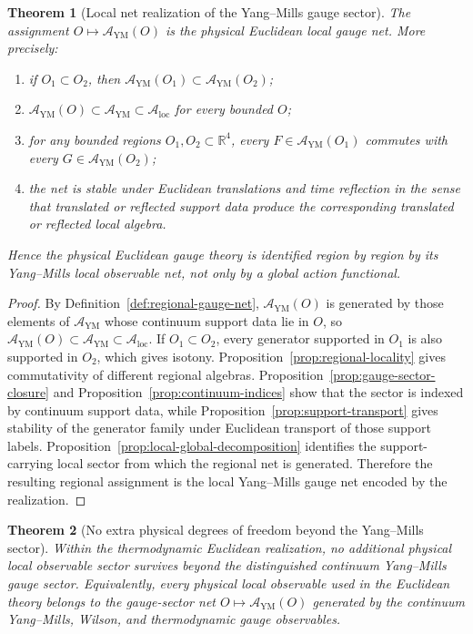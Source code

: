 \documentclass[11pt]{article}
\newtheorem{theorem}{Theorem}[section]
\theoremstyle{definition}
\theoremstyle{remark}
\newcommand{\R}{\mathbb R}
\newcommand{\mcA}{\mathcal A}
\begin{document}
\begin{theorem}[Local net realization of the Yang--Mills gauge sector]
\label{thm:local-net-equivalence}
The assignment \(O\mapsto \mcA_{\mathrm{YM}}(O)\) is the physical Euclidean
local gauge net.  More precisely:
\begin{enumerate}[label=\textnormal{(\roman*)},leftmargin=1.5em]
\item if \(O_1\subset O_2\), then \(\mcA_{\mathrm{YM}}(O_1)\subset
\mcA_{\mathrm{YM}}(O_2)\);
\item \(\mcA_{\mathrm{YM}}(O)\subset\mcA_{\mathrm{YM}}\subset\mcA_{\mathrm{loc}}\)
for every bounded \(O\);
\item for any bounded regions \(O_1,O_2\subset\R^4\), every
\(F\in\mcA_{\mathrm{YM}}(O_1)\) commutes with every
\(G\in\mcA_{\mathrm{YM}}(O_2)\);
\item the net is stable under Euclidean translations and time reflection in the
sense that translated or reflected support data produce the corresponding
translated or reflected local algebra.
\end{enumerate}
Hence the physical Euclidean gauge theory is identified region by region by its
Yang--Mills local observable net, not only by a global action functional.
\end{theorem}

\begin{proof}
By Definition~\ref{def:regional-gauge-net}, \(\mcA_{\mathrm{YM}}(O)\) is
generated by those elements of \(\mcA_{\mathrm{YM}}\) whose continuum support
data lie in \(O\), so \(\mcA_{\mathrm{YM}}(O)\subset\mcA_{\mathrm{YM}}\subset
\mcA_{\mathrm{loc}}\).  If \(O_1\subset O_2\), every generator supported in
\(O_1\) is also supported in \(O_2\), which gives isotony.
Proposition~\ref{prop:regional-locality} gives commutativity of different
regional algebras.  Proposition~\ref{prop:gauge-sector-closure}
and Proposition~\ref{prop:continuum-indices} show that the sector is indexed by
continuum support data, while Proposition~\ref{prop:support-transport} gives
stability of the generator family under Euclidean transport of those support
labels.  Proposition~\ref{prop:local-global-decomposition} identifies the
support-carrying local sector from which the regional net is generated.
Therefore the resulting regional assignment is the local
Yang--Mills gauge net encoded by the realization.
\end{proof}

\begin{theorem}[No extra physical degrees of freedom beyond the Yang--Mills sector]
\label{thm:no-extra-sector}
Within the thermodynamic Euclidean realization, no
additional physical local observable sector survives beyond the distinguished
continuum Yang--Mills gauge sector.  Equivalently, every physical local
observable used in the Euclidean theory belongs to the gauge-sector net
\(O\mapsto\mcA_{\mathrm{YM}}(O)\) generated by the continuum Yang--Mills,
Wilson, and thermodynamic gauge observables.
\end{theorem}
\end{document}
